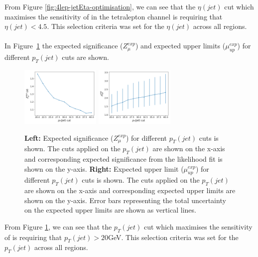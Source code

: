 From Figure \ref{fig:4lep-jetEta-optimisation}, we can see that the $\eta(jet)$ cut which maximises the sensitivity of \tWZ in the tetralepton channel is requiring that $\eta(jet) < 4.5$. This selection criteria was set for the $\eta(jet)$ across all regions.\\\\


In Figure~\ref{fig:4lep-jetpt-optimisation} the expected significance ($Z_{\mu}^{exp}$) and expected upper limits ($\mu_{up}^{exp}$) for different $p_{T}(jet)$ cuts are shown.
\begin{figure}[h!]
	\includegraphics[width = 0.34\textwidth]{figures/signif_jetPt.png}
  	\includegraphics[width = 0.34\textwidth]{figures/exp_upper_jetPt.png}
  \centering
	\caption{\textbf{Left:} Expected significance ($Z_{\mu}^{exp}$) for different $p_{T}(jet)$ cuts is shown. The cuts applied on the $p_{T}(jet)$ are shown on the x-axis and corresponding expected significance from the likelihood fit is shown on the y-axis. \textbf{Right:} Expected upper limit ($\mu_{up}^{exp}$) for different $p_{T}(jet)$ cuts is shown. The cuts applied on the $p_{T}(jet)$ are shown on the x-axis and corresponding expected upper limits are shown on the y-axis. Error bars representing the total uncertainty on the expected upper limits are shown as vertical lines.}
		\label{fig:4lep-jetpt-optimisation}
\end{figure}


From Figure \ref{fig:4lep-jetpt-optimisation}, we can see that the $p_{T}(jet)$ cut which maximises the sensitivity of \tWZ is requiring that $p_{T}(jet) > 20$GeV. This selection criteria was set for the $p_{T}(jet)$ across all regions.\\\\

